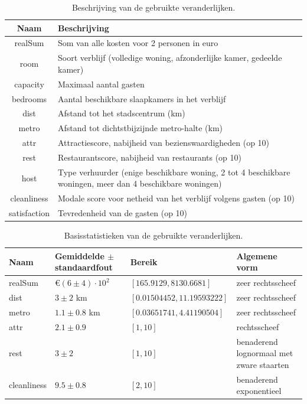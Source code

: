 \documentclass[a4paper]{kulakarticle}
\begin{document}
\begin{table}[h]
	\centering
	\begin{tabular}{c|p{10cm}}
		\raggedright
		Naam & Beschrijving\\
		\hline
		realSum & Som van alle kosten voor 2 personen in euro\\ 
		room & Soort verblijf (volledige woning, afzonderlijke kamer, gedeelde kamer) \\ 
		capacity & Maximaal aantal gasten \\
		bedrooms & Aantal beschikbare slaapkamers in het verblijf \\
		dist & Afstand tot het stadscentrum (km) \\
		metro & Afstand tot dichtstbijzijnde metro-halte (km)\\
		attr & Attractiescore, nabijheid van bezienswaardigheden (op 10)\\
		rest & Restaurantscore, nabijheid van restaurants (op 10)\\ 
		host & Type verhuurder (enige beschikbare woning, 2 tot 4 beschikbare woningen, meer dan 4 beschikbare woningen) \\ 
		cleanliness & Modale score voor netheid van het verblijf volgens gasten (op 10) \\
		satisfaction & Tevredenheid van de gasten (op 10)\\
		
	\end{tabular}
	\caption{Beschrijving van de gebruikte veranderlijken.}
	\label{beschrijving}
\end{table}
\begin{table}[h]
	\centering
	\begin{tabular}{| l| l| l|  p{5cm} |}
		\hline
		Naam & Gemiddelde $\pm$ standaardfout  & Bereik & Algemene vorm\\  [1ex]
		\hline\hline
		realSum & €$(6 \pm 4) \cdot 10^{2} $ & $[165.9129, 8130.6681]$  &  zeer rechtsscheef\\    [0.5ex]
		\hline
		dist & $3 \pm 2$ km  & $[0.01504452, 11.19593222]$ & zeer rechtsscheef \\  [0.5ex]
		\hline
		metro & $1.1 \pm 0.8$ km & $[0.03651741, 4.41190504]$ & zeer rechtsscheef \\ [0.5ex]
		\hline
		attr & $2.1 \pm 0.9$ & $[1, 10]$  & rechtsscheef \\  [0.5ex]
		\hline
		rest & $3 \pm 2$ & $[1, 10]$ & benaderend lognormaal met zware staarten \\ [0.5ex]
		\hline
		cleanliness & $9.5 \pm 0.8$ & $[2, 10]$ & benaderend exponentieel  \\ [0.5ex]
		\hline
	\end{tabular}
	\caption{Basisstatistieken van de gebruikte veranderlijken.}
	\label{uitreksel}
\end{table}
	
\end{document}

